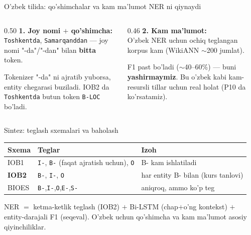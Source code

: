 \documentclass[aspectratio=169,11pt]{beamer}
\begin{document}
\begin{frame}{O'zbek tilida: qo'shimchalar va kam ma'lumot NER ni qiynaydi}
  \begin{columns}[T]
    \begin{column}{0.50\textwidth}
      \textbf{1. Joy nomi $+$ qo'shimcha:}\\[3pt]
      \small
      \texttt{Toshkentda}, \texttt{Samarqanddan} --- joy nomi "-da"/"-dan" bilan
      \textbf{bitta} token.
      \begin{tcolorbox}[warnbox,title=Xavf,top=2pt,bottom=2pt]
        \footnotesize
        Tokenizer "-da" ni ajratib yuborsa, entity chegarasi buziladi. IOB2 da
        \texttt{Toshkentda} butun token \texttt{B-LOC} bo'ladi.
      \end{tcolorbox}
    \end{column}
    \begin{column}{0.46\textwidth}
      \textbf{2. Kam ma'lumot:}\\[3pt]
      \small
      O'zbek NER uchun ochiq teglangan korpus kam (WikiANN $\sim$200 jumlat).
      \begin{tcolorbox}[okbox,title=Halol baho,top=2pt,bottom=2pt]
        \footnotesize
        F1 past bo'ladi ($\sim$40--60\%) --- buni \textbf{yashirmaymiz}. Bu o'zbek
        kabi kam-resursli tillar uchun real holat (P10 da ko'rsatamiz).
      \end{tcolorbox}
    \end{column}
  \end{columns}
\end{frame}

\begin{frame}{Sintez: teglash sxemalari va baholash}
  \begin{center}\small
  \begin{tabular}{p{2.6cm}p{4.2cm}p{4.0cm}}
    \toprule
    \textbf{Sxema} & \textbf{Teglar} & \textbf{Izoh} \\
    \midrule
    IOB1 & \texttt{I-}, \texttt{B-} (faqat ajratish uchun), \texttt{O} & B- kam ishlatiladi \\
    \textbf{IOB2} & \texttt{B-}, \texttt{I-}, \texttt{O} & har entity B- bilan (kurs tanlovi) \\
    BIOES & \texttt{B-},\texttt{I-},\texttt{O},\texttt{E-},\texttt{S-} & aniqroq, ammo ko'p teg \\
    \bottomrule
  \end{tabular}
  \end{center}
  \vspace{4pt}
  \begin{tcolorbox}[okbox,title=Asosiy g'oya,top=2pt,bottom=2pt]
    \footnotesize
    NER $=$ ketma-ketlik teglash (IOB2) $+$ Bi-LSTM (chap$+$o'ng kontekst) $+$
    entity-darajali F1 (seqeval). O'zbek uchun qo'shimcha va kam ma'lumot asosiy
    qiyinchiliklar.
  \end{tcolorbox}
\end{frame}
\end{document}

